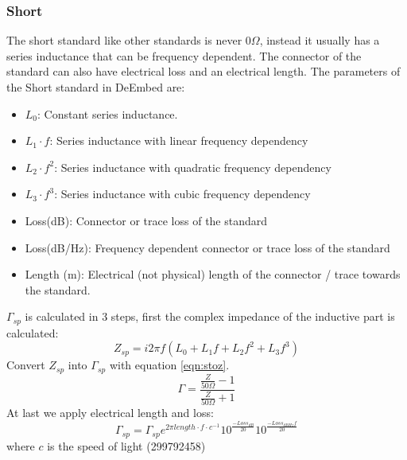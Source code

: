 \subsubsection{Short}
The short standard like other standards is never $0\Omega$, instead it usually has a series inductance that can be frequency dependent. The connector of the standard can also have electrical loss and an electrical length. The parameters of the Short standard in DeEmbed are:
\begin{itemize}
	\item $L_0$: Constant series inductance.
	\item $L_1 \cdot f$: Series inductance with linear frequency dependency
	\item $L_2 \cdot f^2$: Series inductance with quadratic frequency dependency
	\item $L_3 \cdot f^3$: Series inductance with cubic frequency dependency
	\item Loss(dB): Connector or trace loss of the standard
	\item Loss(dB/Hz): Frequency dependent connector or trace loss of the standard
	\item Length (m): Electrical (not physical) length of the connector / trace towards the standard.
\end{itemize}
$\Gamma_{sp}$ is calculated in 3 steps, first the complex impedance of the inductive part is calculated:
\begin{equation}
Z_{sp} = i 2 \pi f (L_0 + L_1 f + L_2 f^2 + L_3 f^3)
\end{equation}
Convert $Z_{sp}$ into $\Gamma_{sp}$ with equation \ref{eqn:stoz}.
\begin{equation}
\label{eqn:stoz}
\Gamma=\frac{\frac{Z}{50\Omega}-1}{\frac{Z}{50\Omega}+1}
\end{equation}
At last we apply electrical length and loss:
\begin{equation}
\Gamma_{sp} = \Gamma_{sp} e^{2 \pi length\cdot f\cdot c^{-1}} 10^{\frac{-Loss_{dB}}{20}} 10^{\frac{-Loss_{dBHz} f }{20}}
\end{equation}
where $c$ is the speed of light (299792458)


